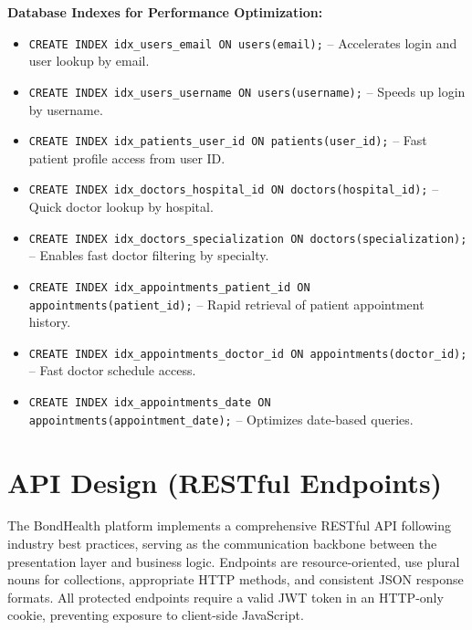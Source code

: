 \vspace{0.3cm}
\textbf{Database Indexes for Performance Optimization:}

\begin{itemize}
    \item \texttt{CREATE INDEX idx\_users\_email ON users(email);} -- Accelerates login
    and user lookup by email.
    \item \texttt{CREATE INDEX idx\_users\_username ON users(username);} -- Speeds up
    login by username.
    \item \texttt{CREATE INDEX idx\_patients\_user\_id ON patients(user\_id);} -- Fast
    patient profile access from user ID.
    \item \texttt{CREATE INDEX idx\_doctors\_hospital\_id ON doctors(hospital\_id);} --
    Quick doctor lookup by hospital.
    \item \texttt{CREATE INDEX idx\_doctors\_specialization ON doctors(specialization);} --
    Enables fast doctor filtering by specialty.
    \item \texttt{CREATE INDEX idx\_appointments\_patient\_id ON appointments(patient\_id);}
    -- Rapid retrieval of patient appointment history.
    \item \texttt{CREATE INDEX idx\_appointments\_doctor\_id ON appointments(doctor\_id);}
    -- Fast doctor schedule access.
    \item \texttt{CREATE INDEX idx\_appointments\_date ON appointments(appointment\_date);}
    -- Optimizes date-based queries.
\end{itemize}


\section{API Design (RESTful Endpoints)}

\justifying
\noindent
The BondHealth platform implements a comprehensive RESTful API following industry best
practices, serving as the communication backbone between the presentation layer and business
logic. Endpoints are resource-oriented, use plural nouns for collections, appropriate HTTP
methods, and consistent JSON response formats. All protected endpoints require a valid JWT
token in an HTTP-only cookie, preventing exposure to client-side JavaScript.

